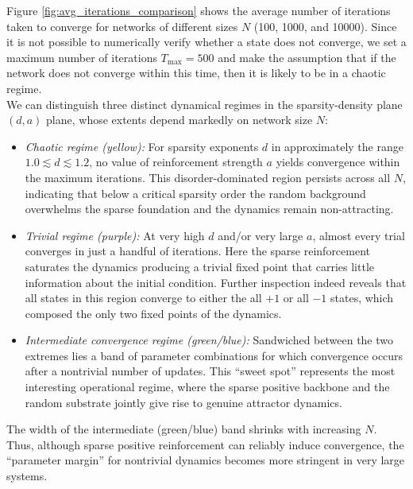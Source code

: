 \documentclass[a4paper,12pt]{report}
\begin{document}
Figure \ref{fig:avg_iterations_comparison} shows the average number of iterations
taken to converge for networks of different sizes \(N\) (100, 1000, and 10000).
Since it is not possible to numerically verify whether a state does not
converge, we set a maximum number of iterations \(T_{\max} = 500\) and 
make the assumption that if the network does not converge within this time,
then it is likely to be in a chaotic regime. \\
We can distinguish three distinct dynamical regimes in the sparsity-density
plane \((d,a)\) plane, whose extents depend markedly on network size \(N\):

\begin{itemize}
  \item \emph{Chaotic regime (yellow):}  
    For sparsity exponents \(d\) in approximately the range 
    \(1.0 \lesssim d \lesssim 1.2\), no value of reinforcement 
    strength \(a\) yields convergence within the maximum iterations.  
    This disorder-dominated region persists across all \(N\), 
    indicating that below a critical sparsity order the random 
    background overwhelms the sparse foundation and the dynamics 
    remain non-attracting.

  \item \emph{Trivial regime (purple):}  
    At very high \(d\) and/or very large \(a\), almost every trial 
    converges in just a handful of iterations.  Here the sparse 
    reinforcement saturates the dynamics producing a trivial fixed 
    point that carries little information about the initial condition. 
    Further inspection indeed reveals that all states in this region 
    converge to either the all \(+1\) or all \(-1\) states, which 
    composed the only two fixed points of the dynamics.

  \item \emph{Intermediate convergence regime (green/blue):}  
    Sandwiched between the two extremes lies a band of parameter 
    combinations for which convergence occurs after a nontrivial 
    number of updates. This ``sweet spot'' represents the most 
    interesting operational regime, where the sparse positive backbone 
    and the random substrate jointly give rise to genuine attractor 
    dynamics.

\end{itemize}

The width of the intermediate (green/blue) band shrinks with 
increasing \(N\). Thus, although sparse positive reinforcement can 
reliably induce convergence, the ``parameter margin'' for nontrivial 
dynamics becomes more stringent in very large systems.
\end{document}
